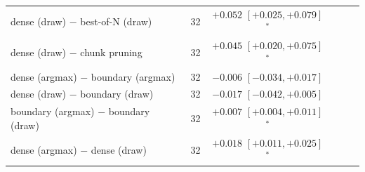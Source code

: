 \begin{tabular}{llcccc}
dense (draw) $-$ best-of-N (draw) & 32 & $+0.052$ $[+0.025, +0.079]$$^*$ & & & \\
dense (draw) $-$ chunk pruning & 32 & $+0.045$ $[+0.020, +0.075]$$^*$ & & & \\
dense (argmax) $-$ boundary (argmax) & 32 & $-0.006$ $[-0.034, +0.017]$ & & & \\
dense (draw) $-$ boundary (draw) & 32 & $-0.017$ $[-0.042, +0.005]$ & & & \\
boundary (argmax) $-$ boundary (draw) & 32 & $+0.007$ $[+0.004, +0.011]$$^*$ & & & \\
dense (argmax) $-$ dense (draw) & 32 & $+0.018$ $[+0.011, +0.025]$$^*$ & & & \\
\bottomrule
\end{tabular}
